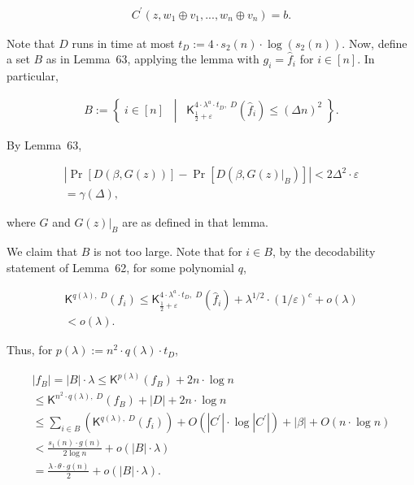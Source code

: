 \documentclass[10pt,a4paper]{article}
\begin{document}
\[\begin{gathered}
C^{\prime}(z,w_{1}\oplus v_{1},...,w_{n}\oplus v_{n})=b.
\end{gathered}\]


Note that $D$ runs in time at most $t_{D}:=4\cdot s_{2}(n)\cdot\log(s_{2}(n))$. Now, define a set $B$ as in Lemma 63, applying the lemma with $g_{i}=\hat{f}_{i}$ for $i\in[n]$. In particular,\par


\[\begin{gathered}
B:=\left\{\;i\in[n]\;\;\middle|\;\;{\mathsf{K}}^{4\cdot\lambda^{a}\cdot t_{D},\;D}_{\frac{1}{2}+\varepsilon}(\hat{f}_{i})\leq(\Delta n)^{2}\;\right\}.
\end{gathered}\]


By Lemma 63,\par


\[\begin{gathered}
\displaystyle\left|\Pr[D(\beta,G(z))]-\Pr[D(\beta,G(z)|_{B})]\right| \displaystyle<2\Delta^{2}\cdot\varepsilon \\
\displaystyle=\gamma(\Delta),
\end{gathered}\]


where $G$ and $G(z)|_{B}$ are as defined in that lemma.\par




We claim that $B$ is not too large. Note that for $i\in B$, by the decodability statement of Lemma 62, for some polynomial $q$,\par


\[\begin{gathered}
\displaystyle{\mathsf{K}}^{q(\lambda),\;D}(f_{i}) \displaystyle\leq{\mathsf{K}}^{4\cdot\lambda^{a}\cdot t_{D},\;D}_{\frac{1}{2}+\varepsilon}(\hat{f}_{i})+\lambda^{1/2}\cdot(1/\varepsilon)^{c}+o(\lambda) \\
\displaystyle<o(\lambda).
\end{gathered}\]


Thus, for $p(\lambda):=n^{2}\cdot q(\lambda)\cdot t_{D}$,\par


\[\begin{gathered}
\displaystyle|f_{B}|=|B|\cdot\lambda \displaystyle\leq{\mathsf{K}}^{p(\lambda)}(f_{B})+2n\cdot\log n \\
\displaystyle\leq{\mathsf{K}}^{n^{2}\cdot q(\lambda),\;D}(f_{B})+|D|+2n\cdot\log
n \\
\displaystyle\leq\sum_{i\in B}\left({\mathsf{K}}^{q(\lambda),\;D}(f_{i})\right)+O(|C^{\prime}|\cdot\log|C^{\prime}|)+|\beta|+O(n\cdot\log n) \\
\displaystyle<\frac{s_{1}(n)\cdot g(n)}{2\log n}+o(|B|\cdot\lambda) \\
\displaystyle=\frac{\lambda\cdot\theta\cdot g(n)}{2}+o(|B|\cdot\lambda).
\end{gathered}\]
\end{document}
